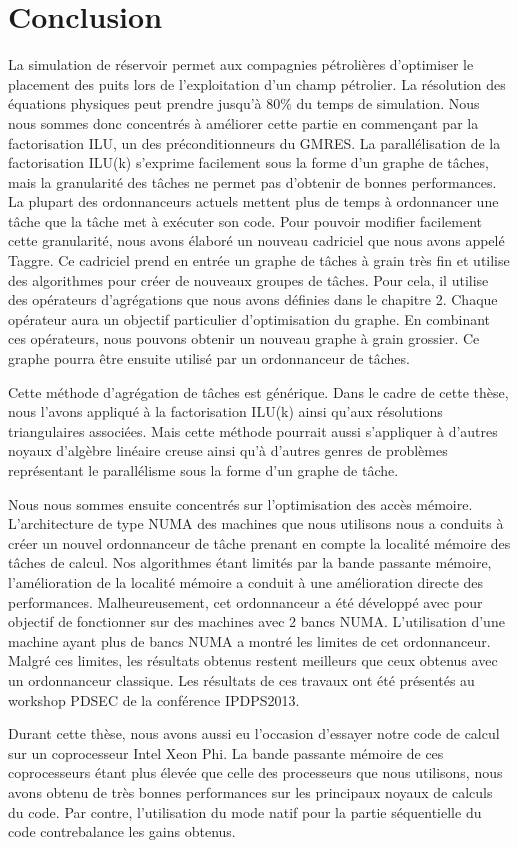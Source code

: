 \section{Conclusion}
La simulation de réservoir permet aux compagnies pétrolières d'optimiser le placement des puits lors de l'exploitation d'un champ pétrolier.
%
La résolution des équations physiques peut prendre jusqu'à 80\% du temps de simulation.
%
Nous nous sommes donc concentrés à améliorer cette partie en commençant par la factorisation ILU, un des préconditionneurs du GMRES.
%
La parallélisation de la factorisation ILU(k) s'exprime facilement sous la forme d'un graphe de tâches, mais la granularité des tâches ne permet pas d'obtenir de bonnes performances.
%
La plupart des ordonnanceurs actuels mettent plus de temps à ordonnancer une tâche que la tâche met à exécuter son code.
%
Pour pouvoir modifier facilement cette granularité, nous avons élaboré un nouveau cadriciel que nous avons appelé Taggre.
%
Ce cadriciel prend en entrée un graphe de tâches à grain très fin et utilise des algorithmes pour créer de nouveaux groupes de tâches.
%
Pour cela, il utilise des opérateurs d'agrégations que nous avons définies dans le chapitre 2.
%
Chaque opérateur aura un objectif particulier d'optimisation du graphe.
%
En combinant ces opérateurs, nous pouvons obtenir un nouveau graphe à grain grossier.
%
Ce graphe pourra être ensuite utilisé par un ordonnanceur de tâches.

Cette méthode d'agrégation de tâches est générique.
%
Dans le cadre de cette thèse, nous l'avons appliqué à la factorisation ILU(k) ainsi qu'aux résolutions triangulaires associées.
%
Mais cette méthode pourrait aussi s'appliquer à d'autres noyaux d'algèbre linéaire creuse ainsi qu'à d'autres genres de problèmes représentant le parallélisme sous la forme d'un graphe de tâche.

Nous nous sommes ensuite concentrés sur l'optimisation des accès mémoire.
%
L'architecture de type NUMA des machines que nous utilisons nous a conduits à créer un nouvel ordonnanceur de tâche prenant en compte la localité mémoire des tâches de calcul.
%
Nos algorithmes étant limités par la bande passante mémoire, l'amélioration de la localité mémoire a conduit à une amélioration directe des performances.
%
Malheureusement, cet ordonnanceur a été développé avec pour objectif de fonctionner sur des machines avec 2 bancs NUMA.
%
L'utilisation d'une machine ayant plus de bancs NUMA a montré les limites de cet ordonnanceur.
%
Malgré ces limites, les résultats obtenus restent meilleurs que ceux obtenus avec un ordonnanceur classique.
%
Les résultats de ces travaux ont été présentés au workshop PDSEC de la conférence IPDPS2013.

Durant cette thèse, nous avons aussi eu l'occasion d'essayer notre code de calcul sur un coprocesseur Intel Xeon Phi.
%
La bande passante mémoire de ces coprocesseurs étant plus élevée que celle des processeurs que nous utilisons, nous avons obtenu de très bonnes performances sur les principaux noyaux de calculs du code.
%
Par contre, l'utilisation du mode natif pour la partie séquentielle du code contrebalance les gains obtenus.
